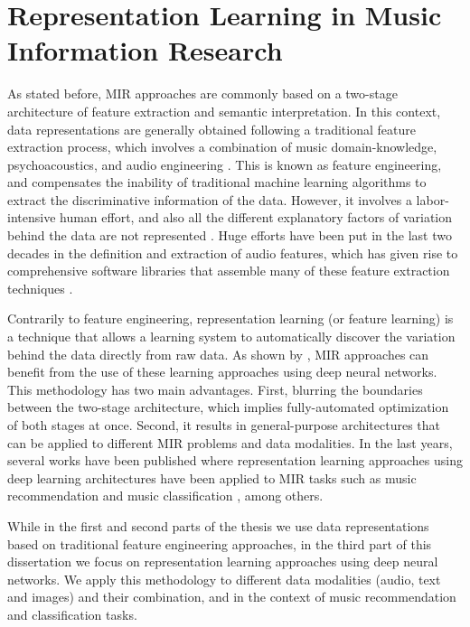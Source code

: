 \section{Representation Learning in Music Information Research}
\label{sec:intro:learning}

As stated before, MIR approaches are commonly based on a two-stage architecture of feature extraction and semantic interpretation. In this context, data representations are generally obtained following a traditional feature extraction process, which involves a combination of music domain-knowledge, psychoacoustics, and audio engineering \citep{humphrey2012}. 
This is known as feature engineering, and compensates the inability of traditional machine learning algorithms to extract the discriminative information of the data. However, it involves a labor-intensive human effort, and also all the different explanatory factors of variation behind the data are not represented \citep{bengio2013representation}. 
Huge efforts have been put in the last two decades in the definition and extraction of audio features, which has given rise to comprehensive software libraries that assemble many of these feature extraction techniques \citep{bogdanov2013essentia, Mcfee2015}. 

Contrarily to feature engineering, representation learning (or feature learning) is a technique that allows a learning system to automatically discover the variation behind the data directly from raw data. As shown by \cite{humphrey2012}, MIR approaches can benefit from the use of these learning approaches using deep neural networks. This methodology has two main advantages. First, blurring the boundaries between the two-stage architecture, which implies fully-automated optimization of both stages at once. Second, it results in general-purpose architectures that can be applied to different MIR problems and data modalities. In the last years, several works have been published where representation learning approaches using deep learning architectures have been applied to MIR tasks such as music recommendation \citep{Oord2013} and music classification \citep{Choi2016}, among others.

While in the first and second parts of the thesis we use data representations based on traditional feature engineering approaches, in the third part of this dissertation we focus on representation learning approaches using deep neural networks. We apply this methodology to different data modalities (audio, text and images) and their combination, and in the context of music recommendation and classification tasks.


